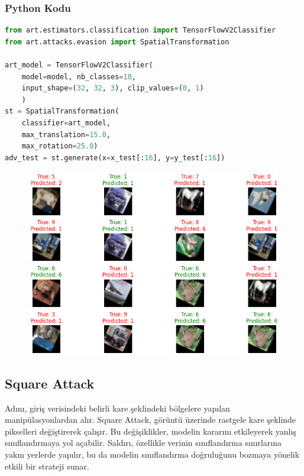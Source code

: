 \subsubsection{Python Kodu}

\begin{lstlisting}[language=Python]
from art.estimators.classification import TensorFlowV2Classifier
from art.attacks.evasion import SpatialTransformation

art_model = TensorFlowV2Classifier(
    model=model, nb_classes=10, 
    input_shape=(32, 32, 3), clip_values=(0, 1)
    )
st = SpatialTransformation(
    classifier=art_model, 
    max_translation=15.0, 
    max_rotation=25.0)
adv_test = st.generate(x=x_test[:16], y=y_test[:16])
\end{lstlisting}

\newpage

\begin{figure}[h]
    \centering
    \includegraphics[width=1\textwidth]{images/spatial_transformation_results.png}
    \caption{}
\end{figure}

\newpage

\subsection{Square Attack}

Adını, giriş verisindeki belirli kare şeklindeki bölgelere yapılan manipülasyonlardan alır. Square Attack, görüntü üzerinde rastgele kare şeklinde pikselleri değiştirerek çalışır. Bu değişiklikler, modelin kararını etkileyerek yanlış sınıflandırmaya yol açabilir. Saldırı, özellikle verinin sınıflandırma sınırlarına yakın yerlerde yapılır, bu da modelin sınıflandırma doğruluğunu bozmaya yönelik etkili bir strateji sunar.

